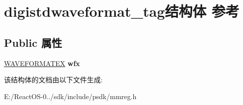 \hypertarget{structdigistdwaveformat__tag}{}\section{digistdwaveformat\+\_\+tag结构体 参考}
\label{structdigistdwaveformat__tag}
\subsection*{Public 属性}
\begin{DoxyCompactItemize}
\item 
\mbox{\label{structdigistdwaveformat__tag_ad28d25c95ccd3bac820e83c5e764894d}} 
\hyperlink{struct_w_a_v_e_f_o_r_m_a_t_e_x}{W\+A\+V\+E\+F\+O\+R\+M\+A\+T\+EX} {\bfseries wfx}
\end{DoxyCompactItemize}


该结构体的文档由以下文件生成\+:\begin{DoxyCompactItemize}
\item 
E\+:/\+React\+O\+S-\/0../sdk/include/psdk/mmreg.\+h\end{DoxyCompactItemize}
